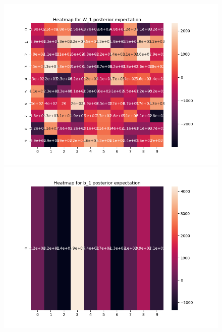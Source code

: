 \documentclass[10pt]{homeworg}
\begin{document}
\begin{figure}[!htbp]
    \centering
    \begin{minipage}{0.45\textwidth}
        \centering
       \includegraphics[scale=0.5]{figures/heatmap_exp_W_1.png}
    \end{minipage}\hfill
    \begin{minipage}{0.45\textwidth}
        \centering
        \includegraphics[scale=0.5]{figures/heatmap_exp_b_1.png}
    \end{minipage}
\end{figure}
\end{document}
